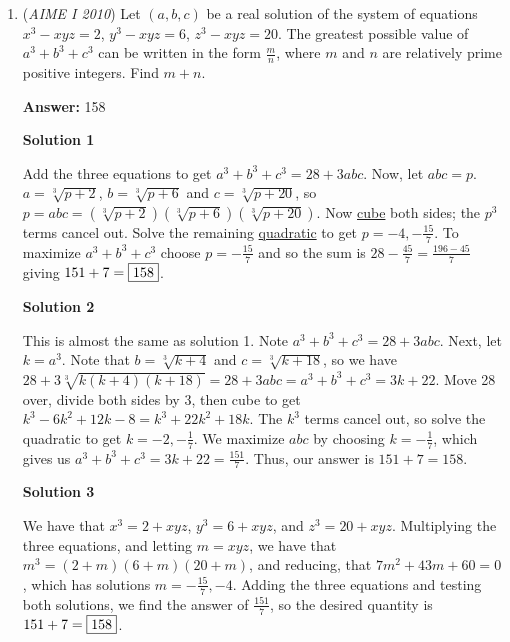 \begin{enumerate}
 Using the distance formula, we find that the distance between the two points is $\sqrt {130}$. Since the line connecting those two points passes through the circle's center, it is the diameter. So, the radius can be found by dividing $\sqrt {130}$ by $2$ to get $\frac {\sqrt {130}}2$, and $m+n=130 + 2 = \boxed{132}$.

 


	\item (\textit{AIME I 2010}) Let $(a,b,c)$ be a real solution of the system of equations $x^3 - xyz = 2$, $y^3 - xyz = 6$, $z^3 - xyz = 20$. The greatest possible value of $a^3 + b^3 + c^3$ can be written in the form $\frac {m}{n}$, where $m$ and $n$ are relatively prime positive integers. Find $m + n$.


 
 \textbf{Answer: }158



\textbf{Solution 1}

Add the three equations to get $a^3 + b^3 + c^3 = 28 + 3abc$.  Now, let $abc = p$.  $a = \sqrt [3]{p + 2}$, $b = \sqrt [3]{p + 6}$ and $c = \sqrt [3]{p + 20}$, so $p = abc = (\sqrt [3]{p + 2})(\sqrt [3]{p + 6})(\sqrt [3]{p + 20})$.  Now \href{https://artofproblemsolving.com/wiki/index.php?title=Cube}{cube} both sides; the $p^3$ terms cancel out.  Solve the remaining \href{https://artofproblemsolving.com/wiki/index.php?title=Quadratic}{quadratic} to get $p = - 4, - \frac {15}{7}$.  To maximize $a^3 + b^3 + c^3$ choose $p = - \frac {15}{7}$ and so the sum is $28 - \frac {45}{7} = \frac {196 - 45}{7}$ giving $151 + 7 = \fbox{158}$.

 



\textbf{Solution 2}

This is almost the same as solution 1. Note $a^3 + b^3 + c^3 = 28 + 3abc$. Next, let $k = a^3$. Note that $b = \sqrt [3]{k + 4}$ and  $c = \sqrt [3]{k + 18}$, so we have $28 + 3\sqrt [3]{k(k+4)(k+18)} = 28+3abc=a^3+b^3+c^3=3k+22$. Move 28 over, divide both sides by 3, then cube to get $k^3-6k^2+12k-8 = k^3+22k^2+18k$. The $k^3$ terms cancel out, so solve the quadratic to get $k = -2, -\frac{1}{7}$. We maximize $abc$ by choosing $k = -\frac{1}{7}$, which gives us $a^3+b^3+c^3 = 3k + 22 = \frac{151}{7}$. Thus, our answer is $151+7=\boxed{158}$.

 



\textbf{Solution 3}

We have that $x^3 = 2 + xyz$, $y^3 = 6 + xyz$, and $z^3 = 20 + xyz$. Multiplying the three equations, and letting $m = xyz$, we have that $m^3 = (2+m)(6+m)(20+m)$, and reducing, that $7m^2 + 43m + 60 = 0$, which has solutions $m = -\frac{15}{7}, -4$. Adding the three equations and testing both solutions, we find the answer of $\frac{151}{7}$, so the desired quantity is $151 + 7 = \fbox{158}$.


\end{enumerate}
